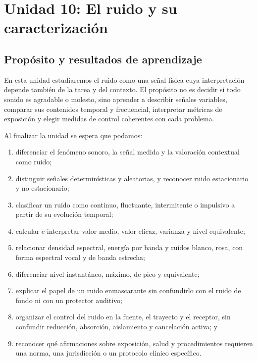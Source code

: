 \chapter{Unidad 10: El ruido y su caracterización}
\label{chap:unidad-10}

\section{Propósito y resultados de aprendizaje}
\label{sec:u10-proposito}

En esta unidad estudiaremos el ruido como una señal física cuya interpretación
depende también de la tarea y del contexto. El propósito no es decidir si todo
sonido es agradable o molesto, sino aprender a describir señales variables,
comparar sus contenidos temporal y frecuencial, interpretar métricas de
exposición y elegir medidas de control coherentes con cada problema.

Al finalizar la unidad se espera que podamos:
\begin{enumerate}
    \item diferenciar el fenómeno sonoro, la señal medida y la valoración
    contextual como ruido;
    \item distinguir señales determinísticas y aleatorias, y reconocer ruido
    estacionario y no estacionario;
    \item clasificar un ruido como continuo, fluctuante, intermitente o
    impulsivo a partir de su evolución temporal;
    \item calcular e interpretar valor medio, valor eficaz, varianza y nivel
    equivalente;
    \item relacionar densidad espectral, energía por banda y ruidos blanco,
    rosa, con forma espectral vocal y de banda estrecha;
    \item diferenciar nivel instantáneo, máximo, de pico y equivalente;
    \item explicar el papel de un ruido enmascarante sin confundirlo con el
    ruido de fondo ni con un protector auditivo;
    \item organizar el control del ruido en la fuente, el trayecto y el
    receptor, sin confundir reducción, absorción, aislamiento y cancelación
    activa; y
    \item reconocer qué afirmaciones sobre exposición, salud y procedimientos
    requieren una norma, una jurisdicción o un protocolo clínico específico.
\end{enumerate}

